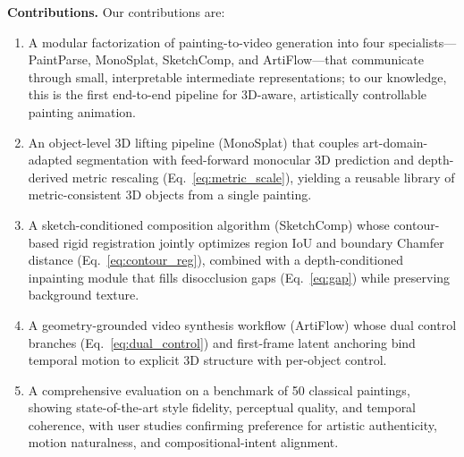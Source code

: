 \smallskip
\noindent\textbf{Contributions.} Our contributions are:
\begin{enumerate}
    \item A modular factorization of painting-to-video generation into
    four specialists---PaintParse, MonoSplat, SketchComp, and
    ArtiFlow---that communicate through small, interpretable
    intermediate representations; to our knowledge, this is the first
    end-to-end pipeline for 3D-aware, artistically controllable
    painting animation.
    \item An object-level 3D lifting pipeline (MonoSplat) that couples
    art-domain-adapted segmentation with feed-forward monocular 3D
    prediction and depth-derived metric rescaling
    (Eq.~\ref{eq:metric_scale}), yielding a reusable library of
    metric-consistent 3D objects from a single painting.
    \item A sketch-conditioned composition algorithm (SketchComp)
    whose contour-based rigid registration jointly optimizes region IoU
    and boundary Chamfer distance (Eq.~\ref{eq:contour_reg}), combined
    with a depth-conditioned inpainting module that fills disocclusion
    gaps (Eq.~\ref{eq:gap}) while preserving background texture.
    \item A geometry-grounded video synthesis workflow (ArtiFlow)
    whose dual control branches (Eq.~\ref{eq:dual_control}) and
    first-frame latent anchoring bind temporal motion to explicit 3D
    structure with per-object control.
    \item A comprehensive evaluation on a benchmark of 50 classical
    paintings, showing state-of-the-art style fidelity, perceptual
    quality, and temporal coherence, with user studies confirming
    preference for artistic authenticity, motion naturalness, and
    compositional-intent alignment.
\end{enumerate}

